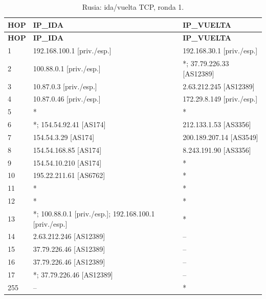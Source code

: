 \begin{longtable}{p{0.95cm}p{7.075cm}p{7.075cm}}
\caption{Rusia: ida/vuelta TCP, ronda 1.}\label{anexo:vuelta:37.79.226.46:TCP:1} \\
\toprule
\textbf{HOP} & \textbf{IP\_\allowbreak{}IDA} & \textbf{IP\_\allowbreak{}VUELTA} \\ \midrule
\endfirsthead
\toprule
\textbf{HOP} & \textbf{IP\_\allowbreak{}IDA} & \textbf{IP\_\allowbreak{}VUELTA} \\ \midrule
\endhead
1 & 192.168.100.1 [priv./esp.] & 192.168.30.1 [priv./esp.] \\
2 & 100.88.0.1 [priv./esp.] & *; 37.79.226.33 [AS12389] \\
3 & 10.87.0.3 [priv./esp.] & 2.63.212.245 [AS12389] \\
4 & 10.87.0.46 [priv./esp.] & 172.29.8.149 [priv./esp.] \\
5 & * & * \\
6 & *; 154.54.92.41 [AS174] & 212.133.1.53 [AS3356] \\
7 & 154.54.3.29 [AS174] & 200.189.207.14 [AS3549] \\
8 & 154.54.168.85 [AS174] & 8.243.191.90 [AS3356] \\
9 & 154.54.10.210 [AS174] & * \\
10 & 195.22.211.61 [AS6762] & * \\
11 & * & * \\
12 & * & * \\
13 & *; 100.88.0.1 [priv./esp.]; 192.168.100.1 [priv./esp.] & * \\
14 & 2.63.212.246 [AS12389] & -- \\
15 & 37.79.226.46 [AS12389] & -- \\
16 & 37.79.226.46 [AS12389] & -- \\
17 & *; 37.79.226.46 [AS12389] & -- \\
255 & -- & * \\
\bottomrule
\end{longtable}
\endgroup
